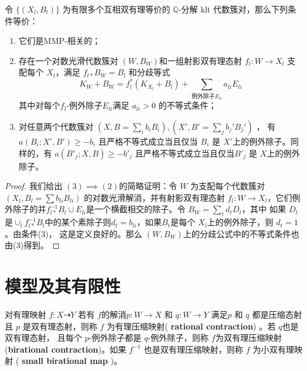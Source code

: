 \begin{lemma}\label{MMPrelatedConditation}
  \cite[Proposition 3.4]{brunoLogSarkisovProgram1995}
  令 $ \{(X_l,B_l)\} $ 为有限多个互相双有理等价的 $ \mathbb{Q} $-分解 klt 代数簇对，那么下列条件等价：
  \begin{enumerate}
    \item 它们是MMP-相关的；
    \item 存在一个对数光滑代数簇对 $ (W,B_W) $和一组射影双有理态射  $ f_l:W\to  X_l $ 支配每个 $ X_l $，满足 $ f_{l*}B_W=B_l $ 和分歧等式
      \[ K_W+B_W=f_l^*(K_{X_l}+B_l)+\sum_{\text{例外除子}E_{li}}{a_{li}E_{li}} \]
          其中对每个$ f_l $-例外除子$E_{li}$满足 $a_{li}>0$ 的不等式条件；
    \item 对任意两个代数簇对 $ (X,B=\sum_ib_{i }B_i),(X',B'=\sum_{j}b_{j}'B_{j}') $ ， 有  $ a(B_i;X',B')\geqslant -b_i $ 且严格不等式成立当且仅当 $ B_i $ 是 $ X' $上的例外除子。同样的，有 $ a(B'_j;X,B)\geqslant -b'_j $ 且严格不等式成立当且仅当$ B'_j $ 是 $ X $上的例外除子。
  \end{enumerate}
\end{lemma}
\begin{proof}
  我们给出  $(3) \implies (2)$的简略证明：令 $W$ 为支配每个代数簇对 $(X_l,B_l=\sum b_{li}B_{li})$ 的对数光滑解消，并有射影双有理态射 $f_l:W\to X_l$，它们例外除子的并$f_{l*}^{-1}B_l\cup E_{li}$是一个横截相交的除子。令 $B_W=\sum_t d_tD_t $，其中  如果 $D_t$ 是$\cup_l f_{l*}^{-1}B_l$中的某个素除子则$d_t = b_{li}$，如果$B_{t}$是每个 $X_{l}$上的例外除子，则  $d_t=1$。由条件(3)， 这是定义良好的。那么 $(W,B_{W})$上的分歧公式中的不等式条件也由(3)得到。
\end{proof}

\section{模型及其有限性}

\begin{definition}
  \cite[\S 2]{haconSarkisovProgram2012} 对有理映射 $f:X\dashrightarrow Y$  若有 $f$的解消$p:W\to X$ 和 $q:W\to Y$ 满足$p$  和 $q$ 都是压缩态射且 $p$ 是双有理态射，则称 $f$ 为有理压缩映射( \textbf{rational contraction})  。若 $ q$也是双有理态射， 且每个 $p$-例外除子都是 $q$-例外除子，则称 $f$为双有理压缩映射 (\textbf{birational contraction})。如果 $f^{-1}$ 也是双有理压缩映射，则称 $f$ 为小双有理映射   ( \textbf{small birational map} )。
\end{definition}

